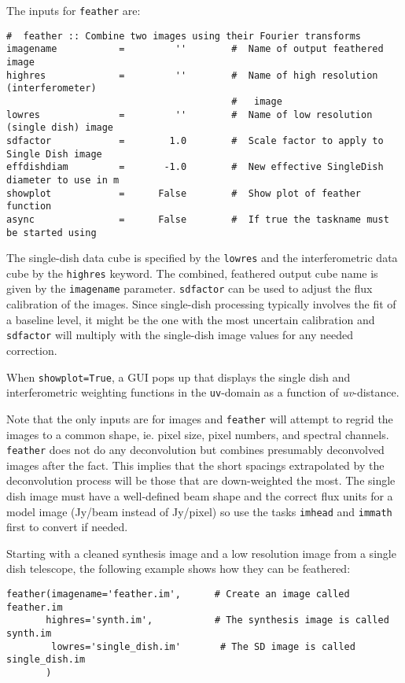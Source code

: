 The inputs for {\tt feather} are:
\small
\begin{verbatim}
#  feather :: Combine two images using their Fourier transforms
imagename           =         ''        #  Name of output feathered image
highres             =         ''        #  Name of high resolution (interferometer)
                                        #   image
lowres              =         ''        #  Name of low resolution (single dish) image
sdfactor            =        1.0        #  Scale factor to apply to Single Dish image
effdishdiam         =       -1.0        #  New effective SingleDish diameter to use in m
showplot            =      False        #  Show plot of feather function
async               =      False        #  If true the taskname must be started using
\end{verbatim}
\normalsize 


The single-dish data cube is specified by the {\tt lowres} and the
interferometric data cube by the {\tt highres} keyword. The combined,
feathered output cube name is given by the {\tt imagename}
parameter. {\tt sdfactor} can be used to adjust the flux calibration
of the images. Since single-dish processing typically involves the fit
of a baseline level, it might be the one with the most uncertain
calibration and {\tt sdfactor} will multiply with the single-dish
image values for any needed correction.

When {\tt showplot=True}, a GUI pops up that displays the single dish
and interferometric weighting functions in the {\tt uv}-domain as a function
of {\it uv}-distance.

Note that the only inputs are for images and {\tt feather} will
attempt to regrid the images to a common shape, ie. pixel size, pixel
numbers, and spectral channels. {\tt feather} does not do any
deconvolution but combines presumably deconvolved images after the
fact. This implies that the short spacings extrapolated by the
deconvolution process will be those that are down-weighted the
most. The single dish image must have a well-defined beam shape and
the correct flux units for a model image (Jy/beam instead of Jy/pixel)
so use the tasks {\tt imhead} and {\tt immath} first to convert if
needed.

Starting with a cleaned synthesis image and a low resolution image
from a single dish telescope, the following example shows how they
can be feathered:
\small
\begin{verbatim}
feather(imagename='feather.im',      # Create an image called feather.im
       highres='synth.im',           # The synthesis image is called synth.im
        lowres='single_dish.im'       # The SD image is called single_dish.im
       )
\end{verbatim}
\normalsize




